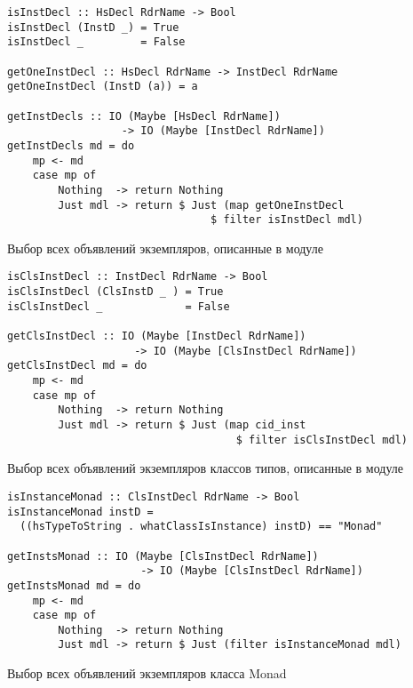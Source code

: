\begin{ListingEnv}[h]
\begin{lstlisting}
isInstDecl :: HsDecl RdrName -> Bool
isInstDecl (InstD _) = True
isInstDecl _         = False

getOneInstDecl :: HsDecl RdrName -> InstDecl RdrName
getOneInstDecl (InstD (a)) = a

getInstDecls :: IO (Maybe [HsDecl RdrName]) 
                  -> IO (Maybe [InstDecl RdrName])
getInstDecls md = do
    mp <- md
    case mp of 
        Nothing  -> return Nothing
        Just mdl -> return $ Just (map getOneInstDecl
                                $ filter isInstDecl mdl)
\end{lstlisting}
\caption{Выбор всех объявлений экземпляров, описанные в модуле}\label{p2}
\end{ListingEnv}

\begin{ListingEnv}[h]
\begin{lstlisting}
isClsInstDecl :: InstDecl RdrName -> Bool
isClsInstDecl (ClsInstD _ ) = True
isClsInstDecl _             = False

getClsInstDecl :: IO (Maybe [InstDecl RdrName]) 
                    -> IO (Maybe [ClsInstDecl RdrName])
getClsInstDecl md = do
    mp <- md
    case mp of
        Nothing  -> return Nothing
        Just mdl -> return $ Just (map cid_inst 
                                    $ filter isClsInstDecl mdl)
\end{lstlisting}
\caption{Выбор всех объявлений экземпляров классов типов, описанные в модуле}\label{p3}
\end{ListingEnv}

\begin{ListingEnv}[h]
\begin{lstlisting}
isInstanceMonad :: ClsInstDecl RdrName -> Bool
isInstanceMonad instD = 
  ((hsTypeToString . whatClassIsInstance) instD) == "Monad"

getInstsMonad :: IO (Maybe [ClsInstDecl RdrName])
                     -> IO (Maybe [ClsInstDecl RdrName])
getInstsMonad md = do
    mp <- md
    case mp of
        Nothing  -> return Nothing
        Just mdl -> return $ Just (filter isInstanceMonad mdl)
\end{lstlisting}
\caption{Выбор всех объявлений экземпляров класса Monad}\label{p4}
\end{ListingEnv}

